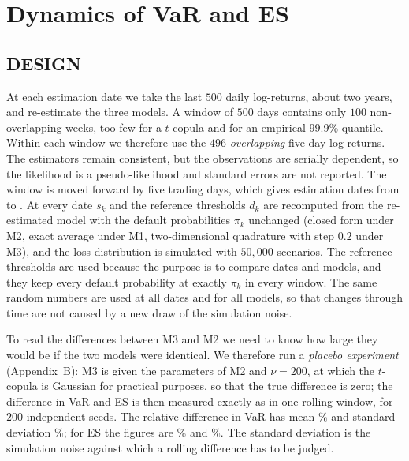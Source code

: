 \section{Dynamics of VaR and ES}
\label{sec:rolling}

\subsection{DESIGN}
At each estimation date we take the last $500$ daily log-returns, about two years, and re-estimate the three models. A window of $500$ days contains only $100$ non-overlapping weeks, too few for a $t$-copula and for an empirical $99.9\%$ quantile. Within each window we therefore use the $496$ \emph{overlapping} five-day log-returns. The estimators remain consistent, but the observations are serially dependent, so the likelihood is a pseudo-likelihood and standard errors are not reported. The window is moved forward by five trading days, which gives  estimation dates from  to . At every date $s_k$ and the reference thresholds $d_k$ are recomputed from the re-estimated model with the default probabilities $\pi_k$ unchanged (closed form under M2, exact average under M1, two-dimensional quadrature with step $0.2$ under M3), and the loss distribution is simulated with $50{,}000$ scenarios. The reference thresholds are used because the purpose is to compare dates and models, and they keep every default probability at exactly $\pi_k$ in every window. The same random numbers are used at all dates and for all models, so that changes through time are not caused by a new draw of the simulation noise.

To read the differences between M3 and M2 we need to know how large they would be if the two models were identical. We therefore run a \emph{placebo experiment} (Appendix~B): M3 is given the parameters of M2 and $\nu=200$, at which the $t$-copula is Gaussian for practical purposes, so that the true difference is zero; the difference in VaR and ES is then measured exactly as in one rolling window, for $200$ independent seeds. The relative difference in VaR has mean \% and standard deviation \%; for ES the figures are \% and \%. The standard deviation is the simulation noise against which a rolling difference has to be judged.

